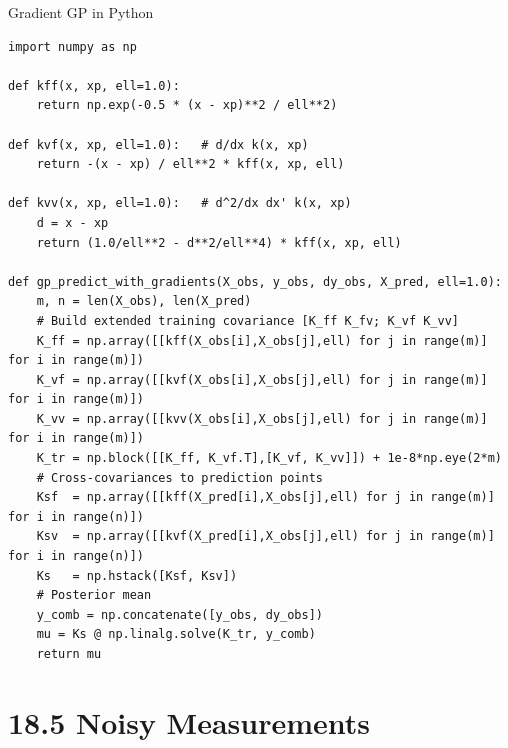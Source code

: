 \documentclass[aspectratio=169,10pt]{beamer}
\begin{document}
\begin{frame}[fragile]{Gradient GP in Python}
\begin{lstlisting}
import numpy as np

def kff(x, xp, ell=1.0):
    return np.exp(-0.5 * (x - xp)**2 / ell**2)

def kvf(x, xp, ell=1.0):   # d/dx k(x, xp)
    return -(x - xp) / ell**2 * kff(x, xp, ell)

def kvv(x, xp, ell=1.0):   # d^2/dx dx' k(x, xp)
    d = x - xp
    return (1.0/ell**2 - d**2/ell**4) * kff(x, xp, ell)

def gp_predict_with_gradients(X_obs, y_obs, dy_obs, X_pred, ell=1.0):
    m, n = len(X_obs), len(X_pred)
    # Build extended training covariance [K_ff K_fv; K_vf K_vv]
    K_ff = np.array([[kff(X_obs[i],X_obs[j],ell) for j in range(m)] for i in range(m)])
    K_vf = np.array([[kvf(X_obs[i],X_obs[j],ell) for j in range(m)] for i in range(m)])
    K_vv = np.array([[kvv(X_obs[i],X_obs[j],ell) for j in range(m)] for i in range(m)])
    K_tr = np.block([[K_ff, K_vf.T],[K_vf, K_vv]]) + 1e-8*np.eye(2*m)
    # Cross-covariances to prediction points
    Ksf  = np.array([[kff(X_pred[i],X_obs[j],ell) for j in range(m)] for i in range(n)])
    Ksv  = np.array([[kvf(X_pred[i],X_obs[j],ell) for j in range(m)] for i in range(n)])
    Ks   = np.hstack([Ksf, Ksv])
    # Posterior mean
    y_comb = np.concatenate([y_obs, dy_obs])
    mu = Ks @ np.linalg.solve(K_tr, y_comb)
    return mu
\end{lstlisting}
\end{frame}

\section{18.5 Noisy Measurements}
\end{document}
